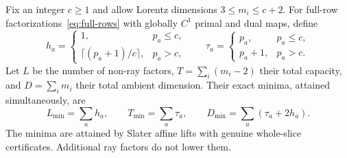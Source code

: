 \begin{theorem}\label{thm:smooth-lorentz}
Fix an integer $c\geq1$ and allow Lorentz dimensions $3\leq m_i\leq c+2$.
For full-row factorizations~\eqref{eq:full-rows} with globally $C^1$
primal and dual maps, define
\[
 h_a=\begin{cases}1,&p_a\leq c,\\
 \lceil(p_a+1)/c\rceil,&p_a>c,\end{cases}
 \qquad
 \tau_a=\begin{cases}p_a,&p_a\leq c,\\p_a+1,&p_a>c.\end{cases}
\]
Let $L$ be the number of non-ray factors, $T=\sum_i(m_i-2)$ their total
capacity, and $D=\sum_im_i$ their total ambient dimension. Their exact
minima, attained simultaneously, are
\begin{equation}\label{eq:smooth-frontier}
 L_{\min}=\sum_ah_a,\qquad T_{\min}=\sum_a\tau_a,
 \qquad D_{\min}=\sum_a(\tau_a+2h_a).
\end{equation}
The minima are attained by Slater affine lifts with genuine whole-slice
certificates. Additional ray factors do not lower them.
\end{theorem}
